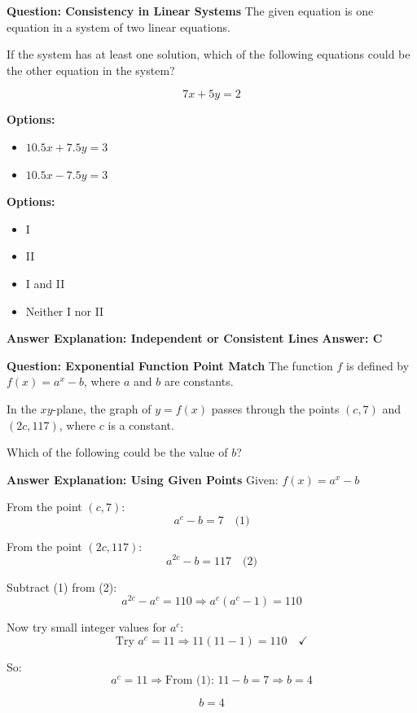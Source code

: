 \documentclass{beamer}
\begin{document}
\begin{frame}{\textbf{Question: Consistency in Linear Systems}}
\small
The given equation is one equation in a system of two linear equations.

If the system has at least one solution, which of the following equations could be the other equation in the system?

\[
7x + 5y = 2
\]

\textbf{Options:}
\begin{itemize}
    \item[I.] $10.5x + 7.5y = 3$
    \item[II.] $10.5x - 7.5y = 3$
\end{itemize}
\textbf{Options:}
\begin{itemize}
    \item[(A)] I
    \item[(B)] II
    \item[(C)] I and II
    \item[(D)] Neither I nor II
\end{itemize}
\end{frame}





\begin{frame}{\textbf{Answer Explanation: Independent or Consistent Lines}}
\textbf{Answer: C}
\end{frame}


\begin{frame}{\textbf{Question: Exponential Function Point Match}}
\small
The function $f$ is defined by $f(x) = a^x - b$, where $a$ and $b$ are constants.

In the $xy$-plane, the graph of $y = f(x)$ passes through the points $(c, 7)$ and $(2c, 117)$, where $c$ is a constant.

Which of the following could be the value of $b$?
\end{frame}


\begin{frame}{\textbf{Answer Explanation: Using Given Points}}
\small
Given: $f(x) = a^x - b$

From the point $(c, 7)$:
\[
a^c - b = 7 \quad \text{(1)}
\]

From the point $(2c, 117)$:
\[
a^{2c} - b = 117 \quad \text{(2)}
\]

Subtract (1) from (2):
\[
a^{2c} - a^c = 110
\Rightarrow a^c(a^c - 1) = 110
\]

Now try small integer values for $a^c$:
\[
\text{Try } a^c = 11 \Rightarrow 11(11 - 1) = 110 \quad \text{✓}
\]

So:
\[
a^c = 11 \Rightarrow \text{From (1): } 11 - b = 7 \Rightarrow b = 4
\]

\[
\boxed{b = 4}
\]
\end{frame}
\end{document}
